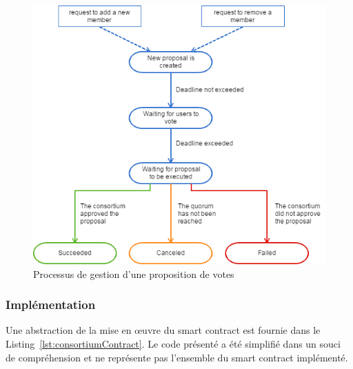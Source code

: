\documentclass{tnreport}
\begin{document}
\begin{figure}[h]
	\centering
	\includegraphics[scale=0.7]{figures/user-management-flow}
	\caption{Processus de gestion d'une proposition de votes}
	\label{fig:user-flow}
\end{figure}

\subsubsection{Implémentation}

Une abstraction de la mise en œuvre du smart contract est fournie dans le Listing~\ref{lst:consortiumContract}. Le code présenté a été simplifié dans un souci de compréhension et ne représente pas l'ensemble du smart contract implémenté.
\end{document}
